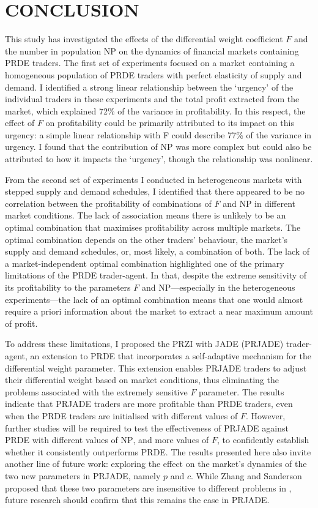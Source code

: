 \documentclass[a4paper,twoside]{article}
\begin{document}
\section{\uppercase{Conclusion}}

This study has investigated the effects of the differential weight coefficient $F$ and the number in population $\mathrm{NP}$ on the dynamics of financial markets containing PRDE traders.
The first set of experiments focused on a market containing a homogeneous population of PRDE traders with perfect elasticity of supply and demand.
I identified a strong linear relationship between the `urgency' of the individual traders in these experiments and the total profit extracted from the market, which explained 72\% of the variance in profitability.
In this respect, the effect of $F$ on profitability could be primarily attributed to its impact on this urgency: a simple linear relationship with F could describe 77\% of the variance in urgency.
I found that the contribution of $\mathrm{NP}$ was more complex but could also be attributed to how it impacts the `urgency', though the relationship was nonlinear.

From the second set of experiments I conducted in heterogeneous markets with stepped supply and demand schedules, I identified that there appeared to be no correlation between the profitability of combinations of $F$ and $\mathrm{NP}$ in different market conditions.
The lack of association means there is unlikely to be an optimal combination that maximises profitability across multiple markets.
The optimal combination depends on the other traders' behaviour, the market's supply and demand schedules, or, most likely, a combination of both.
The lack of a market-independent optimal combination highlighted one of the primary limitations of the PRDE trader-agent.
In that, despite the extreme sensitivity of its profitability to the parameters $F$ and $\mathrm{NP}$---especially in the heterogeneous experiments---the lack of an optimal combination means that one would almost require a priori information about the market to extract a near maximum amount of profit.

To address these limitations, I proposed the PRZI with JADE (PRJADE) trader-agent, an extension to PRDE that incorporates a self-adaptive mechanism for the differential weight parameter.
This extension enables PRJADE traders to adjust their differential weight based on market conditions, thus eliminating the problems associated with the extremely sensitive $F$ parameter.
The results indicate that PRJADE traders are more profitable than PRDE traders, even when the PRDE traders are initialised with different values of $F$.
However, further studies will be required to test the effectiveness of PRJADE against PRDE with different values of $\mathrm{NP}$, and more values of $F$, to confidently establish whether it consistently outperforms PRDE.
The results presented here also invite another line of future work: exploring the effect on the market's dynamics of the two new parameters in PRJADE, namely $p$ and $c$.
While Zhang and Sanderson proposed that these two parameters are insensitive to different problems in \cite{ZhangSanderson}, future research should confirm that this remains the case in PRJADE.


{\small
}
\end{document}

